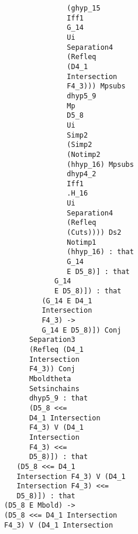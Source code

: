 \documentclass[12pt]{article}
\begin{document}
\begin{verbatim}
                                        (ghyp_15 
                                        Iff1 
                                        G_14 
                                        Ui 
                                        Separation4 
                                        (Refleq 
                                        (D4_1 
                                        Intersection 
                                        F4_3))) Mpsubs 
                                        dhyp5_9 
                                        Mp 
                                        D5_8 
                                        Ui 
                                        Simp2 
                                        (Simp2 
                                        (Notimp2 
                                        (hhyp_16) Mpsubs 
                                        dhyp4_2 
                                        Iff1 
                                        .H_16 
                                        Ui 
                                        Separation4 
                                        (Refleq 
                                        (Cuts)))) Ds2 
                                        Notimp1 
                                        (hhyp_16) : that 
                                        G_14 
                                        E D5_8)] : that 
                                     G_14 
                                     E D5_8)]) : that 
                                  (G_14 E D4_1 
                                  Intersection 
                                  F4_3) -> 
                                  G_14 E D5_8)]) Conj 
                               Separation3 
                               (Refleq (D4_1 
                               Intersection 
                               F4_3)) Conj 
                               Mboldtheta 
                               Setsinchains 
                               dhyp5_9 : that 
                               (D5_8 <<= 
                               D4_1 Intersection 
                               F4_3) V (D4_1 
                               Intersection 
                               F4_3) <<= 
                               D5_8)]) : that 
                            (D5_8 <<= D4_1 
                            Intersection F4_3) V (D4_1 
                            Intersection F4_3) <<= 
                            D5_8)]) : that 
                         (D5_8 E Mbold) -> 
                         (D5_8 <<= D4_1 Intersection 
                         F4_3) V (D4_1 Intersection 

\end{verbatim}
\end{document}
